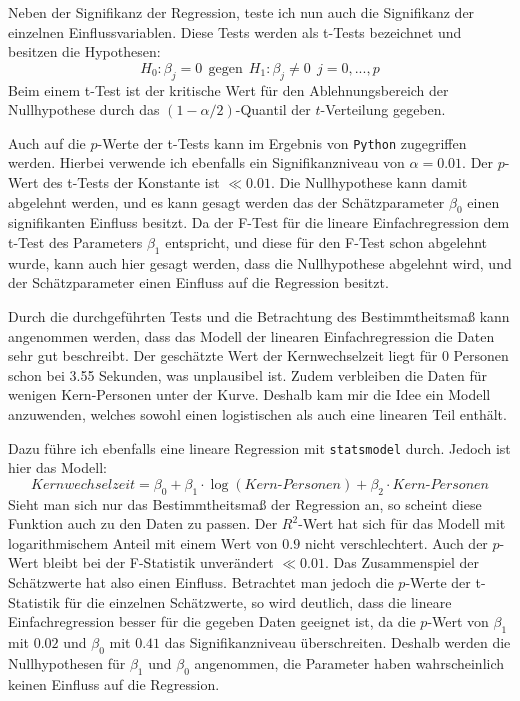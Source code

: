 Neben der Signifikanz der Regression, teste ich nun auch die Signifikanz der einzelnen Einflussvariablen. Diese Tests werden als t-Tests bezeichnet und besitzen die Hypothesen:
$$ H_0:\beta_j = 0 \ \ \text{gegen} \ \ H_1: \beta_j \neq 0 \ \ j = 0, ..., p$$
Beim einem t-Test ist der kritische Wert für den Ablehnungsbereich der Nullhypothese durch das $(1-\alpha/2)$-Quantil der $t$-Verteilung gegeben.

Auch auf die $p$-Werte der t-Tests kann im Ergebnis von \texttt{Python} zugegriffen werden. Hierbei verwende ich ebenfalls ein Signifikanzniveau von $\alpha = 0.01$. Der $p$-Wert des t-Tests der Konstante ist $\ll 0.01$. Die Nullhypothese kann damit abgelehnt werden, und es kann gesagt werden das der Schätzparameter $\beta_0$ einen signifikanten Einfluss besitzt. Da der F-Test für die lineare Einfachregression dem t-Test des Parameters $\beta_1$ entspricht, und diese für den F-Test schon abgelehnt wurde, kann auch hier gesagt werden, dass die Nullhypothese abgelehnt wird, und der Schätzparameter einen Einfluss auf die Regression besitzt.

Durch die durchgeführten Tests und die Betrachtung des Bestimmtheitsmaß kann angenommen werden, dass das Modell der linearen Einfachregression die Daten sehr gut beschreibt. Der geschätzte Wert der Kernwechselzeit liegt für 0 Personen schon bei 3.55 Sekunden, was unplausibel ist. Zudem verbleiben die Daten für wenigen Kern-Personen unter der Kurve. Deshalb kam mir die Idee ein Modell anzuwenden, welches sowohl einen logistischen als auch eine linearen Teil enthält.

Dazu führe ich ebenfalls eine lineare Regression mit \texttt{statsmodel} durch. Jedoch ist hier das Modell:
\begin{equation}
Kernwechselzeit = \beta_0 + \beta_1 \cdot \log(Kern\text{-}Personen) + \beta_2 \cdot Kern\text{-}Personen
\end{equation}
Sieht man sich nur das Bestimmtheitsmaß der Regression an, so scheint diese Funktion auch zu den Daten zu passen. Der $R^2$-Wert hat sich für das Modell mit logarithmischem Anteil mit einem Wert von $0.9$ nicht verschlechtert. Auch der $p$-Wert bleibt bei der F-Statistik unverändert $\ll 0.01$. Das Zusammenspiel der Schätzwerte hat also einen Einfluss. Betrachtet man jedoch die $p$-Werte der t-Statistik für die einzelnen Schätzwerte, so wird deutlich, dass die lineare Einfachregression besser für die gegeben Daten geeignet ist, da die $p$-Wert von $\beta_1$ mit $0.02$ und $\beta_0$ mit $0.41$ das Signifikanzniveau überschreiten. Deshalb werden die Nullhypothesen für $\beta_1$ und $\beta_0$ angenommen, die Parameter haben wahrscheinlich keinen Einfluss auf die Regression.

